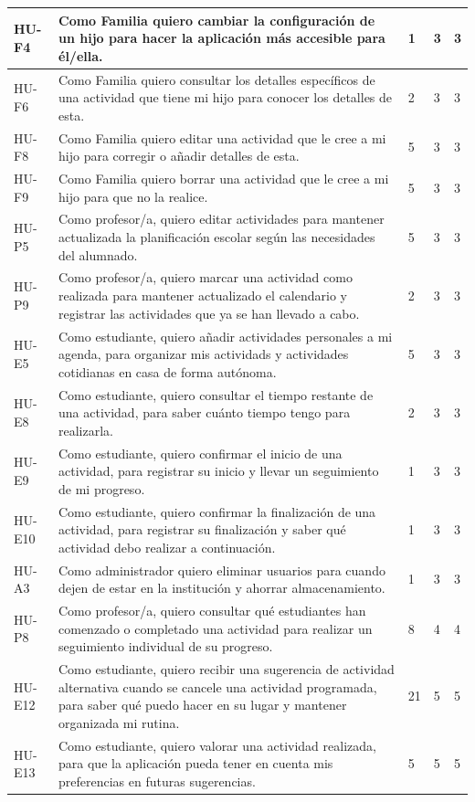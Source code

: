 \begin{xltabular}{\textwidth}{|p{2.2cm}|X|p{1.4cm}|p{1.7cm}|p{1.5cm}|}
HU-F4 & Como Familia quiero cambiar la configuración de un hijo para hacer la aplicación más accesible para él/ella. & 1 & 3 & 3 \\ \hline
HU-F6 & Como Familia quiero consultar los detalles específicos de una actividad que tiene mi hijo para conocer los detalles de esta. & 2 & 3 & 3 \\ \hline
HU-F8 & Como Familia quiero editar una actividad que le cree a mi hijo para corregir o añadir detalles de esta. & 5 & 3 & 3 \\ \hline
HU-F9 & Como Familia quiero borrar una actividad que le cree a mi hijo para que no la realice. & 5 & 3 & 3 \\ \hline
HU-P5 & Como profesor/a, quiero editar actividades para mantener actualizada la planificación escolar según las necesidades del alumnado. & 5 & 3 & 3 \\ \hline
HU-P9 & Como profesor/a, quiero marcar una actividad como realizada para mantener actualizado el calendario y registrar las actividades que ya se han llevado a cabo. & 2 & 3 & 3 \\ \hline
HU-E5 & Como estudiante, quiero añadir actividades personales a mi agenda, para organizar mis actividads y actividades cotidianas en casa de forma autónoma. & 5 & 3 & 3 \\ \hline
HU-E8 & Como estudiante, quiero consultar el tiempo restante de una actividad, para saber cuánto tiempo tengo para realizarla. & 2 & 3 & 3 \\ \hline
HU-E9 & Como estudiante, quiero confirmar el inicio de una actividad, para registrar su inicio y llevar un seguimiento de mi progreso. & 1 & 3 & 3 \\ \hline
HU-E10 & Como estudiante, quiero confirmar la finalización de una actividad, para registrar su finalización y saber qué actividad debo realizar a continuación. & 1 & 3 & 3 \\ \hline
HU-A3 & Como administrador quiero eliminar usuarios para cuando dejen de estar en la institución y ahorrar almacenamiento. & 1 & 3 & 3 \\ \hline
HU-P8 & Como profesor/a, quiero consultar qué estudiantes han comenzado o completado una actividad para realizar un seguimiento individual de su progreso. & 8 & 4 & 4 \\ \hline
HU-E12 & Como estudiante, quiero recibir una sugerencia de actividad alternativa cuando se cancele una actividad programada, para saber qué puedo hacer en su lugar y mantener organizada mi rutina. & 21 & 5 & 5 \\ \hline
HU-E13 & Como estudiante, quiero valorar una actividad realizada, para que la aplicación pueda tener en cuenta mis preferencias en futuras sugerencias. & 5 & 5 & 5 \\ \hline

\end{xltabular}
